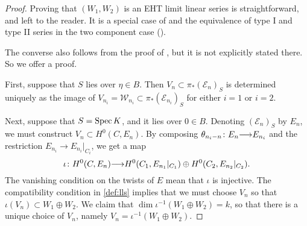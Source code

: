 \documentclass[11pt,reqno]{amsart}
\theoremstyle{plain}
\theoremstyle{definition}
\theoremstyle{remark}
\numberwithin{equation}{section}
\renewcommand{\to}{{\longrightarrow}}
\numberwithin{equation}{section}
\begin{document}
\begin{proof}
  Proving that $(W_1, W_2)$ is an EHT limit linear series is straightforward, and left to the reader.
  It is a special case of \cite[Theorem~4.3.4]{oss:14} and the equivalence of type I and type II series in the two component case (\cite[Remark~3.4.15]{oss:14}).

  The converse also follows from the proof of \cite[Theorem~4.3.4]{oss:14}, but it is not explicitly stated there.
  So we offer a proof.
  
  First, suppose that $S$ lies over $\eta \in B$.
  Then $V_n \subset \pi_* (\mathcal E_n)_S$ is determined uniquely as the image of $V_{n_i} = \mathcal W_{n_i} \subset \pi_* (\mathcal E_{n_i})_S$ for either $i = 1$ or $i = 2$.

  Next, suppose that $S = \operatorname{Spec} K$, and it lies over $0 \in B$.
  Denoting $(\mathcal E_n)_S$ by $E_n$, we must construct $V_n \subset H^0(C, E_n)$.
  By composing $\theta_{n_i-n} \from E_n \to E_{n_i}$ and the restriction $E_{n_i} \to E_{n_i}|_{C_i}$, we get a map
  \[ \iota \from H^0(C, E_n) \to H^0(C_1, E_{n_1}|_{C_1}) \oplus H^0(C_2, E_{n_2}|_{C_2}). \]
  The vanishing condition on the twists of $E$ mean that $\iota$ is injective.
  The compatibility condition in \autoref{def:lls} implies that we must choose $V_n$ so that $\iota (V_n) \subset W_1 \oplus W_2$.
  We claim that $\dim \iota^{-1}(W_1 \oplus W_2) = k$, so that there is a unique choice of $V_n$, namely $V_n = \iota^{-1}(W_1 \oplus W_2)$.


\end{proof}
\end{document}

